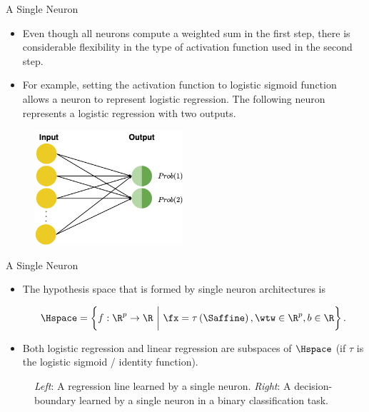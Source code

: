 \begin{vbframe} {A Single Neuron}
\begin{itemize}
\item Even though all neurons compute a weighted sum in the first step, there is considerable flexibility in the type of activation function used in the second step.
\item For example, setting the activation function to logistic sigmoid function allows a neuron to represent logistic regression. The following neuron represents a logistic regression with two outputs.
\end{itemize}
\begin{figure}
\includegraphics[width=5.5cm]{figure/logistic_regression.png}
\end{figure}
\end{vbframe}

\begin{vbframe}{A Single Neuron}
\begin{itemize}
\item The hypothesis space that is formed by single neuron architectures is 
\begin{small}
$$\Hspace  = \left\{f: \R^p \to \R ~\bigg|~ \fx = \tau\left(\Saffine\right), \wtw \in \R^p, b \in \R\right\}.$$ 
\end{small}
\item Both logistic regression and linear regression are subspaces of $\Hspace$ (if $\tau$ is the logistic sigmoid / identity function).  \end{itemize}
\vspace*{-0.48cm}
\begin{figure}
\centering
{}
\vspace*{-0.2cm}
\begin{tiny}
\caption{\textit{Left}: A regression line learned by a single neuron. \textit{Right}: A decision-boundary learned by a single neuron in a binary classification task.}
\end{tiny}
\end{figure}
\end{vbframe}

